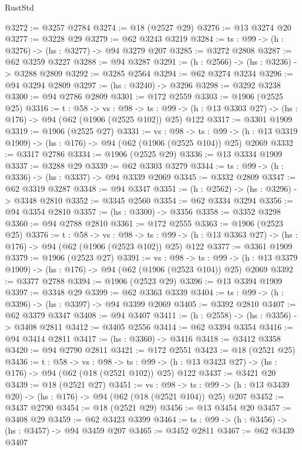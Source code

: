 \begin{lexlean}{RustStd}
\begin{coremodule}
{\begin{coremodule}
{{{{{{{{{@3272 := @3257 @2784
@3274 := @18 (@2527 @29)
@3276 := @13 @3274 @20
@3277 := @3228 @29
@3279 := @62 @3243 @3219
@3284 := {ts : @99} -> (h : @3276) -> (hs : @3277) -> @94 @3279 @207
@3285 := @3272 @2808
@3287 := @62 @3259 @3227
@3288 := @94 @3287
@3291 := (h : @2566) -> (hs : @3236) -> @3288 @2809
@3292 := @3285 @2564
@3294 := @62 @3274 @3234
@3296 := @94 @3294 @2809
@3297 := (hs : @3240) -> @3296
@3298 := @3292 @3238
@3300 := @94 @2786 @2809
@3301 := @172 @2559
@3303 := @1906 (@2525 @25)
@3316 := {t : @58} ->
  {vs : @98} ->
  {ts : @99} -> (h : @13 @3303 @27) -> (hs : @176) -> @94 (@62 (@1906 (@2525 @102)) @25) @122
@3317 := @3301 @1909
@3319 := @1906 (@2525 @27)
@3331 := {vs : @98} ->
  {ts : @99} -> (h : @13 @3319 @1909) -> (hs : @176) -> @94 (@62 (@1906 (@2525 @104)) @25) @2069
@3332 := @3317 @2786
@3334 := @1906 (@2525 @29)
@3336 := @13 @3334 @1909
@3337 := @3288 @29
@3339 := @62 @3303 @3279
@3344 := {ts : @99} -> (h : @3336) -> (hs : @3337) -> @94 @3339 @2069
@3345 := @3332 @2809
@3347 := @62 @3319 @3287
@3348 := @94 @3347
@3351 := (h : @2562) -> (hs : @3296) -> @3348 @2810
@3352 := @3345 @2560
@3354 := @62 @3334 @3294
@3356 := @94 @3354 @2810
@3357 := (hs : @3300) -> @3356
@3358 := @3352 @3298
@3360 := @94 @2788 @2810
@3361 := @172 @2555
@3363 := @1906 (@2523 @25)
@3376 := {t : @58} ->
  {vs : @98} ->
  {ts : @99} -> (h : @13 @3363 @27) -> (hs : @176) -> @94 (@62 (@1906 (@2523 @102)) @25) @122
@3377 := @3361 @1909
@3379 := @1906 (@2523 @27)
@3391 := {vs : @98} ->
  {ts : @99} -> (h : @13 @3379 @1909) -> (hs : @176) -> @94 (@62 (@1906 (@2523 @104)) @25) @2069
@3392 := @3377 @2788
@3394 := @1906 (@2523 @29)
@3396 := @13 @3394 @1909
@3397 := @3348 @29
@3399 := @62 @3363 @3339
@3404 := {ts : @99} -> (h : @3396) -> (hs : @3397) -> @94 @3399 @2069
@3405 := @3392 @2810
@3407 := @62 @3379 @3347
@3408 := @94 @3407
@3411 := (h : @2558) -> (hs : @3356) -> @3408 @2811
@3412 := @3405 @2556
@3414 := @62 @3394 @3354
@3416 := @94 @3414 @2811
@3417 := (hs : @3360) -> @3416
@3418 := @3412 @3358
@3420 := @94 @2790 @2811
@3421 := @172 @2551
@3423 := @18 (@2521 @25)
@3436 := {t : @58} ->
  {vs : @98} ->
  {ts : @99} -> (h : @13 @3423 @27) -> (hs : @176) -> @94 (@62 (@18 (@2521 @102)) @25) @122
@3437 := @3421 @20
@3439 := @18 (@2521 @27)
@3451 := {vs : @98} ->
  {ts : @99} -> (h : @13 @3439 @20) -> (hs : @176) -> @94 (@62 (@18 (@2521 @104)) @25) @207
@3452 := @3437 @2790
@3454 := @18 (@2521 @29)
@3456 := @13 @3454 @20
@3457 := @3408 @29
@3459 := @62 @3423 @3399
@3464 := {ts : @99} -> (h : @3456) -> (hs : @3457) -> @94 @3459 @207
@3465 := @3452 @2811
@3467 := @62 @3439 @3407
}}}}}}}}}
\end{coremodule}}
\end{coremodule}
\end{lexlean}
